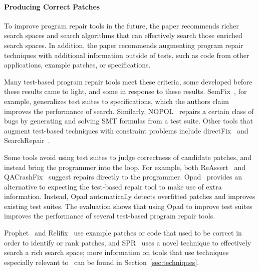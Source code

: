 \paragraph{Producing Correct Patches}
To improve program repair tools in the future, the paper recommends richer search 
spaces and search algorithms that can effectively search those enriched search spaces. 
In addition, the paper recommends augmenting program repair techniques with additional information outside of
tests, such as code from other applications, example patches, or specifications.

Many test-based program repair tools meet these criteria, some developed before these results came to light,
and some in response to these results. 
SemFix~\cite{nguyen2013semfix}, for example,
generalizes test suites to specifications, which the authors claim improves the performance of search.
Similarly, NOPOL~\cite{Xuan:2017:NAR:3071893.3071964} repairs a certain class of bugs by generating and solving SMT formulas from a test suite.
Other tools that augment test-based techniques with constraint problems include
directFix~\cite{Mechtaev:2015:DLS:2818754.2818811} and SearchRepair~\cite{Ke:2015:RPS:2916135.2916260}. %

Some tools avoid using test suites to judge correctness of candidate patches, and instead
bring the programmer into the loop. For example, both ReAssert~\cite{daniel2009reassert}
and QACrashFix~\cite{gao2015fixing} suggest repairs directly to the programmer. %
Opad~\cite{Yang:2017:BTC:3106237.3106274} provides an alternative to expecting the test-based repair tool
to make use of extra information. Instead, Opad automatically detects overfitted patches and improves existing test suites.
The evaluation shows that using Opad to improve test suites improves the performance of several test-based program repair tools. %

Prophet~\cite{Long:2016:APG:2837614.2837617} and Relifix~\cite{Tan:2015:RAR:2818754.2818813} use example patches or code that used to be 
correct in order to identify or rank patches, and SPR~\cite{Long:2015:SPR:2786805.2786811} uses a novel technique to effectively search a rich search space;
more information on tools that use techniques especially relevant to \sysname\ can be found in Section~\ref{sec:techniques}.

